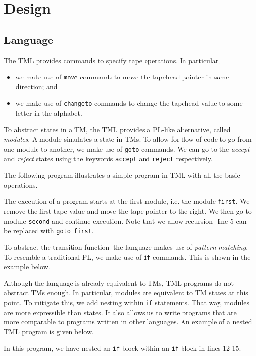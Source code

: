\chapter{Design}
\section{Language}

The TML provides commands to specify tape operations. In particular, 
\begin{itemize}
    \item we make use of \texttt{move} commands to move the tapehead pointer in some direction; and
    \item we make use of \texttt{changeto} commands to change the tapehead value to some letter in the alphabet.
\end{itemize}
To abstract states in a TM, the TML provides a PL-like alternative, called \emph{modules}. A module simulates a state in TMs. To allow for flow of code to go from one module to another, we make use of \texttt{goto} commands. We can go to the \textit{accept} and \textit{reject} states using the keywords \texttt{accept} and \texttt{reject} respectively.

The following program illustrates a simple program in TML with all the basic operations.

The execution of a program starts at the first module, i.e. the module \texttt{first}. We remove the first tape value and move the tape pointer to the right. We then go to module \texttt{second} and continue execution. Note that we allow recursion- line 5 can be replaced with \texttt{goto first}.

To abstract the transition function, the language makes use of \emph{pattern-matching}. To resemble a traditional PL, we make use of \texttt{if} commands. This is shown in the example below.


Although the language is already equivalent to TMs, TML programs do not abstract TMs enough. In particular, modules are equivalent to TM states at this point. To mitigate this, we add nesting within \texttt{if} statements. That way, modules are more expressible than states. It also allows us to write programs that are more comparable to programs written in other languages. An example of a nested TML program is given below.

In this program, we have nested an \texttt{if} block within an \texttt{if} block in lines 12-15.


